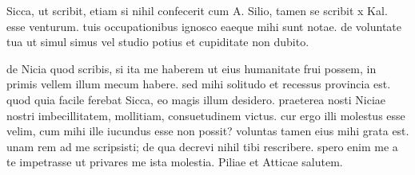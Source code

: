 


 Sicca, ut scribit, etiam si nihil confecerit cum A. Silio, tamen se scribit x Kal. esse venturum. tuis occupationibus ignosco eaeque mihi sunt notae. de voluntate tua ut simul simus vel studio potius et cupiditate non dubito.

 de Nicia quod scribis, si ita me haberem ut eius humanitate frui possem, in primis vellem illum mecum habere. sed mihi solitudo et recessus provincia est. quod quia facile ferebat Sicca, eo magis illum desidero. praeterea nosti Niciae nostri imbecillitatem, mollitiam, consuetudinem victus. cur ergo illi molestus esse velim, cum mihi ille iucundus esse non possit? voluntas tamen eius mihi grata est. unam rem ad me scripsisti; de qua decrevi nihil tibi rescribere. spero enim me a te impetrasse ut privares me ista molestia. Piliae et Atticae salutem.
